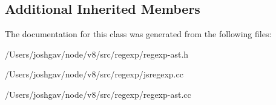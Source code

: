 \subsection*{Additional Inherited Members}


The documentation for this class was generated from the following files\+:\begin{DoxyCompactItemize}
\item 
/\+Users/joshgav/node/v8/src/regexp/regexp-\/ast.\+h\item 
/\+Users/joshgav/node/v8/src/regexp/jsregexp.\+cc\item 
/\+Users/joshgav/node/v8/src/regexp/regexp-\/ast.\+cc\end{DoxyCompactItemize}
